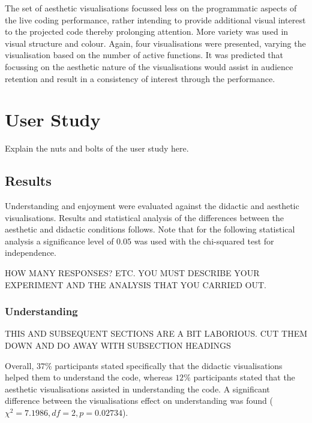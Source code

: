 \documentclass{sig-alternate}
\begin{document}
The set of aesthetic visualisations focussed less on the programmatic aspects of the live coding performance, rather intending to provide additional visual interest to the projected code thereby prolonging attention. More variety was used in visual structure and colour. Again, four visualisations were presented, varying the visualisation based on the number of active functions. It was predicted that focussing on the aesthetic nature of the visualisations would assist in audience retention and result in a consistency of interest through the performance.

\section{User Study}


Explain the nuts and bolts of the user study here. 

\subsection{Results}

Understanding and enjoyment were evaluated against the didactic and aesthetic visualisations. Results and statistical analysis of the differences between the aesthetic and didactic conditions follows. Note that for the following statistical analysis a significance level of $0.05$ was used with the chi-squared test for independence.

HOW MANY RESPONSES? ETC. YOU MUST DESCRIBE YOUR EXPERIMENT AND THE ANALYSIS THAT YOU CARRIED OUT.

\subsubsection{Understanding}

THIS AND SUBSEQUENT SECTIONS ARE A BIT LABORIOUS. CUT THEM DOWN AND DO AWAY WITH SUBSECTION HEADINGS

Overall, $37\%$ participants stated specifically that the didactic visualisations helped them to understand the code, whereas $12\%$ participants stated that the aesthetic visualisations assisted in understanding the code. A significant difference between the visualisations effect on understanding was found ($\chi^2=7.1986,df=2,p=0.02734$).
\end{document}
